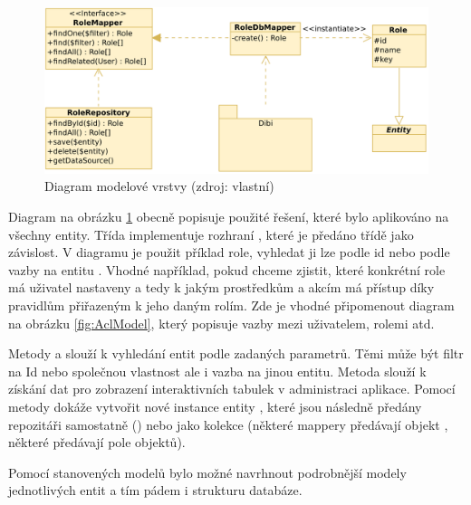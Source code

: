 \begin{figure}[h]
	\centering
	\includegraphics[width=\linewidth]{svg/roleMapper.png}
	\captionsetup{width=\linewidth}
	\caption[Diagram modelové vrstvy]{Diagram modelové vrstvy (zdroj: vlastní)}
	\label{fig:RoleMapper}
\end{figure}

Diagram na obrázku \ref{fig:RoleMapper} obecně popisuje použité řešení, které bylo aplikováno na všechny entity. Třída  implementuje rozhraní , které je předáno třídě  jako závislost. V diagramu je použit příklad role, vyhledat ji lze podle id nebo podle vazby na entitu . Vhodné například, pokud chceme zjistit, které konkrétní role má uživatel nastaveny a tedy k jakým prostředkům a akcím má přístup díky pravidlům přiřazeným k jeho daným rolím. Zde je vhodné připomenout diagram na obrázku \ref{fig:AclModel}, který popisuje vazby mezi uživatelem, rolemi atd.

Metody  a  slouží k vyhledání entit podle zadaných parametrů. Těmi může být filtr na Id nebo společnou vlastnost ale i vazba na jinou entitu. Metoda  slouží k získání dat pro zobrazení interaktivních tabulek v administraci aplikace. Pomocí metody  dokáže vytvořit nové instance entity , které jsou následně předány repozitáři samostatně () nebo jako kolekce (některé mappery předávají objekt , některé předávají pole objektů).
\clearpage

Pomocí stanovených modelů bylo možné navrhnout podrobnější modely jednotlivých entit a tím pádem i strukturu databáze.

